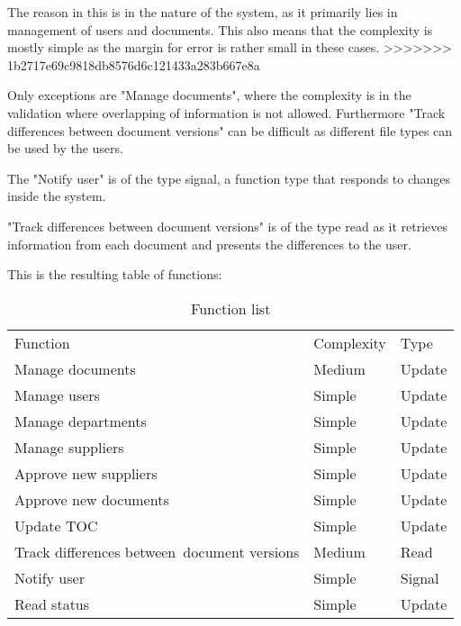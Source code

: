 
The reason in this is in the nature of the system, as it primarily lies in management of users and documents.
This also means that the complexity is mostly simple as the margin for error is rather small in these cases. 
>>>>>>> 1b2717e69c9818db8576d6c121433a283b667e8a

Only exceptions are "Manage documents", where the complexity is in the validation where overlapping of information is not allowed.
Furthermore "Track differences between document versions" can be difficult as different file types can be used by the users.

The "Notify user" is of the type signal, a function type that responds to changes inside the system.

"Track differences between document versions" is of the type read as it retrieves information from each document and presents the differences to the user.

This is the resulting table of functions:

\begin{table}[H]
\centering
\begin{tabular}{lll}
Function                                    & Complexity & Type    \\
Manage documents                            & Medium     & Update  \\
Manage users                                & Simple     & Update  \\
Manage departments                          & Simple     & Update  \\
Manage suppliers                            & Simple     & Update  \\
Approve new suppliers                       & Simple     & Update  \\
Approve new documents                       & Simple     & Update  \\
Update TOC                                  & Simple     & Update  \\
Track differences between~document versions & Medium     & Read    \\
Notify user                                 & Simple     & Signal  \\
Read status                                 & Simple     & Update 
\end{tabular}
\caption{Function list}
\end{table}


